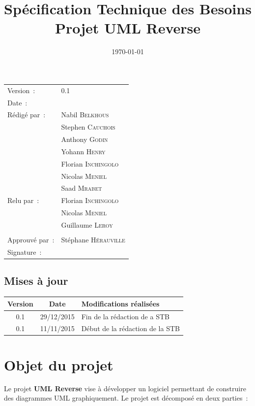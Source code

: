 \documentclass[hidelinks, 10pt,a4paper]{article}
\title{\bfseries Spécification Technique des Besoins\\Projet UML Reverse}
\begin{document}
\maketitle
\begin{center}
\begin{tabular}{ll}
  Version~: & 0.1\\[.5em]
  Date~: & \date{\today}\\[.5em]
  Rédigé par~: & Nabil \textsc{Belkhous}\\
               & Stephen \textsc{Cauchois}\\
               & Anthony \textsc{Godin}\\
               & Yohann \textsc{Henry}\\
               & Florian \textsc{Inchingolo}\\
               & Nicolas \textsc{Meniel}\\
               & Saad \textsc{Mrabet}\\[.5em]
  Relu par~:   & Florian \textsc{Inchingolo}\\
               & Nicolas \textsc{Meniel}\\
               & Guillaume \textsc{Leroy}\\
               &\\[.5em]
  Approuvé par~: & Stéphane \textsc{Hérauville}\\[.5em]
  Signature~: &\\
\end{tabular}
\end{center}

\newpage
\begin{center}
    \section*{Mises à jour}
    \begin{tabular}{|c|c|p{8cm}|}
        \hline{\textbf{Version}} & {\textbf{Date}} & {\textbf{Modifications réalisées}}\\\hline
        {0.1} & {29/12/2015} & {Fin de la rédaction de a STB}\\\hline
        {0.1} & {11/11/2015} & {Début de la rédaction de la STB}\\\hline
    \end{tabular}
\end{center}

\newpage
\tableofcontents

\newpage
\section{Objet du projet}
Le projet \textbf{UML Reverse} vise à développer un logiciel permettant de construire des diagrammes UML graphiquement. Le projet est décomposé en deux parties~:
\end{document}
